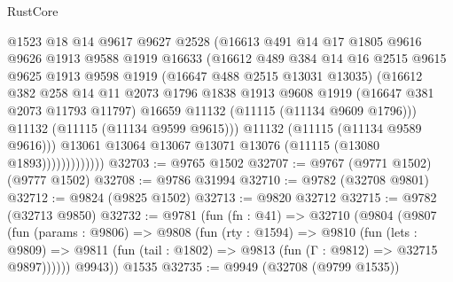 \begin{lexlean}{RustCore}
\begin{coremodule}
                          @1523
                          @18
                          @14
                          @9617
                          @9627
                          @2528
                          (@16613
                            @491
                            @14
                            @17
                            @1805
                            @9616
                            @9626
                            @1913
                            @9588
                            @1919
                            @16633
                            (@16612
                              @489
                              @384
                              @14
                              @16
                              @2515
                              @9615
                              @9625
                              @1913
                              @9598
                              @1919
                              (@16647 @488 @2515 @13031 @13035)
                              (@16612
                                @382
                                @258
                                @14
                                @11
                                @2073
                                @1796
                                @1838
                                @1913
                                @9608
                                @1919
                                (@16647 @381 @2073 @11793 @11797)
                                @16659
                                @11132
                                (@11115 (@11134 @9609 @1796)))
                              @11132
                              (@11115 (@11134 @9599 @9615)))
                            @11132
                            (@11115 (@11134 @9589 @9616)))
                          @13061
                          @13064
                          @13067
                          @13071
                          @13076
                          (@11115 (@13080 @1893)))))))))))))
@32703 := @9765 @1502
@32707 := @9767 (@9771 @1502) (@9777 @1502)
@32708 := @9786 @31994
@32710 := @9782 (@32708 @9801)
@32712 := @9824 (@9825 @1502)
@32713 := @9820 @32712
@32715 := @9782 (@32713 @9850)
@32732 := @9781
    (fun (fn : @41) =>
    @32710
      (@9804
        (@9807
          (fun (params : @9806) =>
          @9808
            (fun (rty : @1594) =>
            @9810
              (fun (lets : @9809) =>
              @9811 (fun (tail : @1802) => @9813 (fun (Γ : @9812) => @32715 @9897))))))
        @9943))
    @1535
@32735 := @9949 (@32708 (@9799 @1535))

\end{coremodule}
\end{lexlean}
